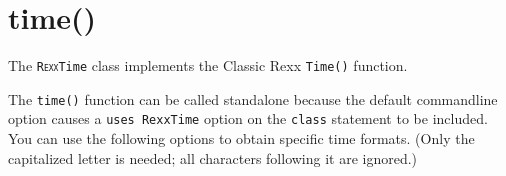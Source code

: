 \section{time()}\label{refrexxtime}
 
The \texttt{R\textsc{exx}Time} class implements the Classic Rexx \texttt{Time()} function.

The \texttt{time()} function can be called standalone because the
default   commandline option causes a \texttt{uses
  RexxTime} option on the \texttt{class} statement to be included. You can use the following options to obtain specific time formats. (Only the capitalized letter is needed; all characters following it are ignored.)
